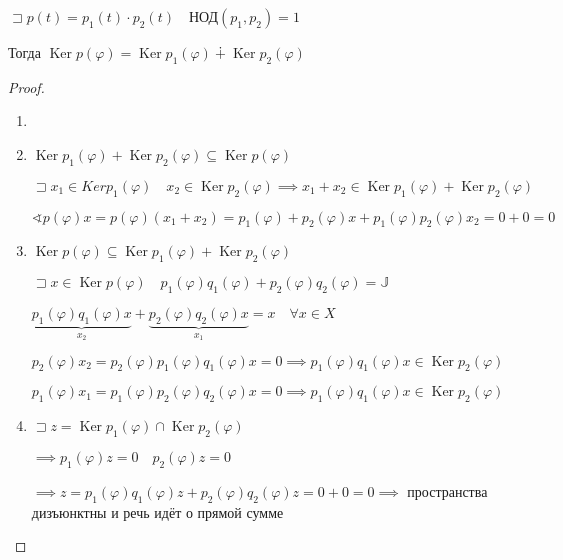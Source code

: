 \documentclass{book}
\DeclareMathOperator{\Ker}{Ker}
\theoremstyle{definition}
\begin{document}
\begin{theorem}
    $\sqsupset p(t) = p_1(t)\cdot p_2(t) \quad \text{НОД}\left( p_1,p_2\right) = 1 $ 

    Тогда $\Ker p\left( \varphi \right)  = \Ker p_1\left( \varphi \right)  \dotplus \Ker p_2\left( \varphi \right) $
\end{theorem}
\begin{proof}
    \begin{enumerate}
        \item []
        \item $\Ker p_1\left( \varphi \right)  + \Ker p_2\left( \varphi \right) \subseteq \Ker p\left( \varphi \right) $

            $\sqsupset x_1\in Ker p_1\left( \varphi \right) \quad x_2\in \Ker p_2\left( \varphi \right) \implies x_1+x_2\in \Ker p_1\left( \varphi \right)  + \Ker p_2\left( \varphi \right) $ 

            $\sphericalangle p\left( \varphi \right) x = p\left( \varphi \right) \left( x_1+x_2 \right)  = p_1\left( \varphi \right) +p_2\left( \varphi \right) x + p_1\left( \varphi \right)p_2\left( \varphi \right) x_2 = 0+0 = 0$
        \item $\Ker p\left( \varphi \right) \subseteq \Ker p_1\left( \varphi \right)  + \Ker p_2\left( \varphi \right) $

            $\sqsupset x\in \Ker p\left( \varphi \right) \quad p_1(\varphi)q_1(\varphi)+p_2(\varphi)q_2(\varphi) = \mathds{J}$

            $\underbrace{p_1(\varphi)q_1(\varphi)x}_{x_2}+\underbrace{p_2(\varphi)q_2(\varphi)x}_{x_1} = x\quad \forall x\in X$

            $p_2\left( \varphi \right) x_2 = p_2\left( \varphi \right) p_1\left( \varphi \right)q_1\left( \varphi \right)  x = 0 \implies p_1\left( \varphi \right) q_1(\varphi)x\in \Ker p_2\left( \varphi \right) $


            $p_1\left( \varphi \right) x_1 = p_1\left( \varphi \right) p_2\left( \varphi \right)q_2\left( \varphi \right)  x = 0 \implies p_1\left( \varphi \right) q_1(\varphi)x\in \Ker p_2\left( \varphi \right) $

        \item $\sqsupset z = \Ker p_1\left( \varphi \right) \cap \Ker p_2\left( \varphi \right) $

            $\implies p_1\left( \varphi \right) z = 0\quad p_2\left( \varphi \right) z = 0$

            $\implies z = p_1\left( \varphi \right) q_1\left( \varphi \right) z + p_2\left( \varphi \right) q_2\left( \varphi \right)z = 0+0 = 0 \implies  $ пространства дизъюнктны и речь идёт о прямой сумме
    \end{enumerate}
\end{proof}
\end{document}
